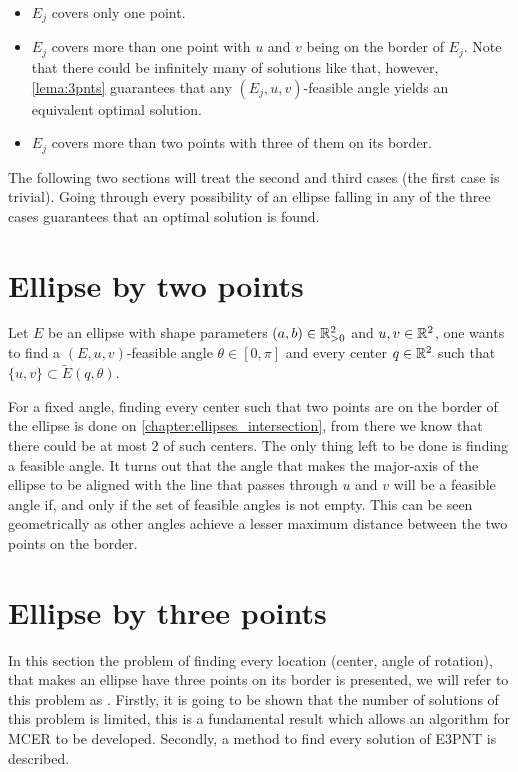 \begin{itemize}
	\item $E_j$ covers only one point.
	\item $E_j$ covers more than one point with $u$ and $v$ being on the border of $E_j$. Note that there could be infinitely many of solutions like that, however, \autoref{lema:3pnts} guarantees that any $(E_j, u, v)$-feasible angle yields an equivalent optimal solution.
	\item $E_j$ covers more than two points with three of them on its border.
\end{itemize}

The following two sections will treat the second and third cases (the first case is trivial). Going through every possibility of an ellipse falling in any of the three cases guarantees that an optimal solution is found.

\section{Ellipse by two points}

Let $E$ be an ellipse with shape parameters $(a, b)\in \mathbb{R}^2_{>0}$ and $u, v\in \mathbb{R}^2$, one wants to find a $(E, u, v)$-feasible angle $\theta\in[0,\pi]$ and every center $q\in\mathbb{R}^2$ such that $\{u, v\} \subset \tilde{E}(q, \theta)$.

For a fixed angle, finding every center such that two points are on the border of the ellipse is done on \autoref{chapter:ellipses_intersection}, from there we know that there could be at most $2$ of such centers. The only thing left to be done is finding a feasible angle. It turns out that the angle that makes the major-axis of the ellipse to be aligned with the line that passes through $u$ and $v$ will be a feasible angle if, and only if the set of feasible angles is not empty. This can be seen geometrically as other angles achieve a lesser maximum distance between the two points on the border.

\section{Ellipse by three points}

In this section the problem of finding every location (center, angle of rotation), that makes an ellipse have three points on its border is presented, we will refer to this problem as . Firstly, it is going to be shown that the number of solutions of this problem is limited, this is a fundamental result which allows an algorithm for MCER to be developed. Secondly, a method to find every solution of E3PNT is described.


